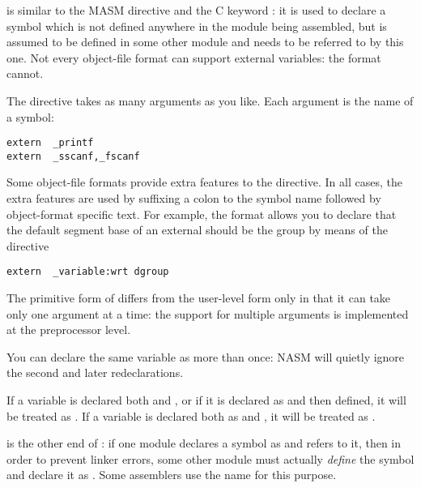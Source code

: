 
 is similar to the MASM directive  and
the C keyword : it is used to declare a symbol which
is not defined anywhere in the module being assembled, but is assumed
to be defined in some other module and needs to be referred to by this
one. Not every object-file format can support external variables:
the  format cannot.

The  directive takes as many arguments as you like.
Each argument is the name of a symbol:

\begin{lstlisting}
extern  _printf
extern  _sscanf,_fscanf
\end{lstlisting}

Some object-file formats provide extra features to the 
directive. In all cases, the extra features are used by suffixing a
colon to the symbol name followed by object-format specific text.
For example, the  format allows you to declare that the
default segment base of an external should be the group 
by means of the directive

\begin{lstlisting}
extern  _variable:wrt dgroup
\end{lstlisting}

The primitive form of  differs from the user-level form
only in that it can take only one argument at a time: the support
for multiple arguments is implemented at the preprocessor level.

You can declare the same variable as  more than once: NASM
will quietly ignore the second and later redeclarations.

If a variable is declared both  and , or
if it is declared as  and then defined, it will be
treated as . If a variable is declared both as
 and , it will be treated as .


 is the other end of : if one module declares a
symbol as  and refers to it, then in order to prevent
linker errors, some other module must actually \emph{define} the
symbol and declare it as . Some assemblers use the name
 for this purpose.

